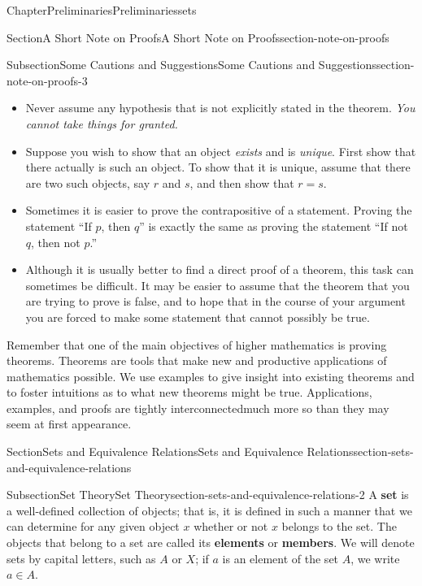 \documentclass[oneside,10pt,]{book}
\newcommand{\terminology}[1]{\textbf{#1}}
\numberwithin{equation}{section}
\begin{document}
\begin{chapterptx}{Chapter}{Preliminaries}{}{Preliminaries}{}{}{sets}
\begin{sectionptx}{Section}{A Short Note on Proofs}{}{A Short Note on Proofs}{}{}{section-note-on-proofs}
\begin{subsectionptx}{Subsection}{Some Cautions and Suggestions}{}{Some Cautions and Suggestions}{}{}{section-note-on-proofs-3}
\begin{itemize}[label=\textbullet]
\item{}Never assume any hypothesis that is not explicitly stated in the theorem.  \emph{You cannot take things for granted.}%
\item{}Suppose you wish to show that an object \emph{exists} and is \emph{unique}.  First show that there actually is such an object.  To show that it is unique, assume that there are two such objects, say \(r\) and \(s\), and then show that \(r = s\).%
\item{}Sometimes it is easier to prove the contrapositive of a statement.  Proving the statement ``If \(p\), then \(q\)'' is exactly the same as proving the statement ``If not \(q\), then not \(p\).''%
\item{}Although it is usually better to find a direct proof of a theorem, this task  can sometimes be difficult. It may be easier to assume that the theorem that you are trying to prove is false, and to hope that in the course of your argument you are forced to make some statement that cannot possibly be true.%
\end{itemize}
%
\par
Remember that one of the main objectives of higher mathematics is proving theorems. Theorems are tools that make new and productive applications of mathematics possible.  We use examples to give insight  into existing theorems and to foster intuitions as to what new theorems might be true.  Applications, examples, and proofs are tightly interconnected\textemdash{}much more so than they may seem at first appearance.%
\end{subsectionptx}
\end{sectionptx}
%
%
\typeout{************************************************}
\typeout{************************************************}
%
\begin{sectionptx}{Section}{Sets and Equivalence Relations}{}{Sets and Equivalence Relations}{}{}{section-sets-and-equivalence-relations}
%
%
\typeout{************************************************}
\typeout{************************************************}
%
\begin{subsectionptx}{Subsection}{Set Theory}{}{Set Theory}{}{}{section-sets-and-equivalence-relations-2}
A \terminology{set} is a well-defined collection of objects; that is, it is defined in such a manner that we can determine for any given object \(x\) whether or not \(x\) belongs to the set.  The objects that belong to a set are called its \terminology{elements} or \terminology{members}. We will denote sets by capital letters, such as \(A\) or \(X\); if \(a\) is an element of the set \(A\), we write \(a \in A\). \label{section-sets-and-equivalence-relations-2-2-11}%

\end{subsectionptx}
\end{sectionptx}
\end{chapterptx}
\end{document}
